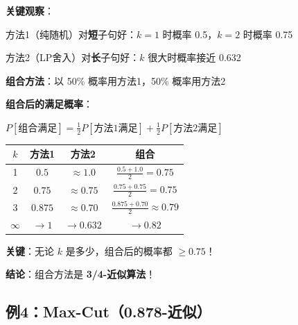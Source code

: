 \documentclass[12pt, a4paper]{ctexart}
\begin{document}
\begin{blackboard}[组合两种方法：3/4 近似]

\textbf{关键观察}：

方法1（纯随机）对\textbf{短}子句好：$k=1$ 时概率 0.5，$k=2$ 时概率 0.75

方法2（LP舍入）对\textbf{长}子句好：$k$ 很大时概率接近 0.632

\textbf{组合方法}：以 50\% 概率用方法1，50\% 概率用方法2

\textbf{组合后的满足概率}：

$P[\text{组合满足}] = \frac{1}{2} P[\text{方法1满足}] + \frac{1}{2} P[\text{方法2满足}]$

\begin{center}
\begin{tabular}{c|cc|c}
$k$ & 方法1 & 方法2 & 组合 \\
\hline
1 & $0.5$ & $\approx 1.0$ & $\frac{0.5 + 1.0}{2} = \mathbf{0.75}$ \\
2 & $0.75$ & $\approx 0.75$ & $\frac{0.75 + 0.75}{2} = \mathbf{0.75}$ \\
3 & $0.875$ & $\approx 0.70$ & $\frac{0.875 + 0.70}{2} \approx 0.79$ \\
$\infty$ & $\to 1$ & $\to 0.632$ & $\to 0.82$
\end{tabular}
\end{center}

\textbf{关键}：无论 $k$ 是多少，组合后的概率都 $\geq 0.75$！

\textbf{结论}：组合方法是 \textbf{3/4-近似算法}！

\end{blackboard}

\subsection{例4：Max-Cut（0.878-近似）}
\end{document}
